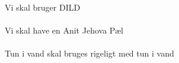 Vi skal bruger DILD\cite{bib:url:Reklame:Dild}
\\
\\
Vi skal have en Anit Jehova Pæl \cite{bib:url:Reklame:Anti}
\\
\\
Tun i vand skal bruges \cite{bib:url:Reklame:Tun} rigeligt med tun i vand
\\
\\

%


